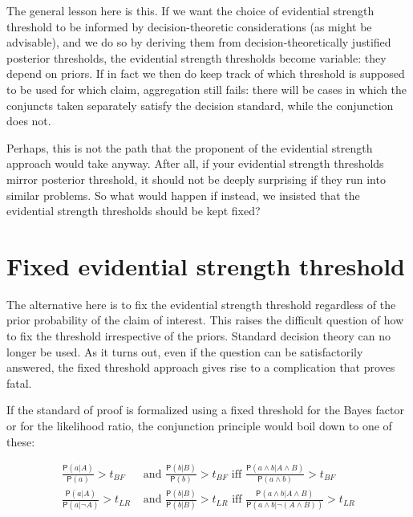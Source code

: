 \documentclass[
  10pt,
  dvipsnames,enabledeprecatedfontcommands]{scrartcl}
\newcommand{\n}{\neg}
\newcommand{\et}{\wedge}
\newcommand{\pr}[1]{\mathsf{P}(#1)}
\begin{document}
The general lesson here is this. If we want the choice of evidential
strength threshold to be informed by decision-theoretic considerations
(as might be advisable), and we do so by deriving them from
decision-theoretically justified posterior thresholds, the evidential
strength thresholds become variable: they depend on priors. If in fact
we then do keep track of which threshold is supposed to be used for
which claim, aggregation still fails: there will be cases in which the
conjuncts taken separately satisfy the decision standard, while the
conjunction does not.

Perhaps, this is not the path that the proponent of the evidential
strength approach would take anyway. After all, if your evidential
strength thresholds mirror posterior threshold, it should not be deeply
surprising if they run into similar problems. So what would happen if
instead, we insisted that the evidential strength thresholds should be
kept fixed?

\hypertarget{fixed-evidential-strength-threshold}{%
\section{Fixed evidential strength
threshold}\label{fixed-evidential-strength-threshold}}

The alternative here is to fix the evidential strength threshold
regardless of the prior probability of the claim of interest. This
raises the difficult question of how to fix the threshold irrespective
of the priors. Standard decision theory can no longer be used. As it
turns out, even if the question can be satisfactorily answered, the
fixed threshold approach gives rise to a complication that proves fatal.

If the standard of proof is formalized using a fixed threshold for the
Bayes factor or for the likelihood ratio, the conjunction principle
would boil down to one of these:

\begin{align*} \frac{\pr{a \vert A }}{\pr{a}}>t_{BF} &\mbox{ and } 
\frac{\pr{ b \vert B}}{\pr{b}}>t_{BF} \mbox{ iff } 
\frac{\pr{a \et b \vert A \et B}}{\pr{a \et b}}>t_{BF} \\
 \frac{\pr{a \vert A }}{\pr{a \vert \n A}}>t_{LR} &\mbox{ and } 
\frac{\pr{ b \vert B}}{\pr{b\vert B}}>t_{LR} \mbox{ iff } 
\frac{\pr{a \et b \vert A \et B}}{\pr{a \et b\vert \n (A \et B)}}>t_{LR} \\
\end{align*}
\end{document}

